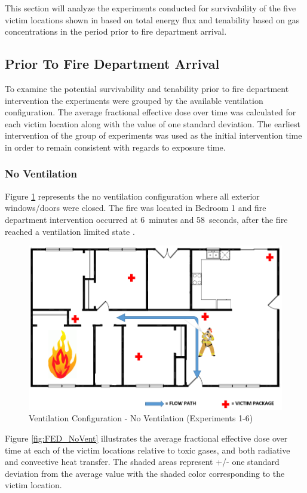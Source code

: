 \documentclass[12pt,oneside]{book}
\begin{document}
This section will analyze the experiments conducted for survivability of the five victim locations shown in  based on total energy flux and tenability based on gas concentrations in the period prior to fire department arrival. 

\subsection{Prior To Fire Department Arrival}
To examine the potential survivability and tenability prior to fire department intervention the experiments were grouped by the available ventilation configuration. The average fractional effective dose over time was calculated for each victim location along with the value of one standard deviation. The earliest intervention of the group of experiments was used as the initial intervention time in order to remain consistent with regards to exposure time.

\subsubsection{No Ventilation}

Figure \ref{fig:Vent_Profile-No_Vent} represents the no ventilation configuration where all exterior windows/doors were closed. The fire was located in Bedroom 1 and fire department intervention occurred at 6~minutes and 58~seconds, after the fire reached a ventilation limited state . 

\begin{figure}[H]
	\centering
	\includegraphics[width=.65\textwidth]{Figures/General/No_Vent_interior_config.png}
	\caption{Ventilation Configuration - No Ventilation (Experiments 1-6)}
	\label{fig:Vent_Profile-No_Vent}
\end{figure}

 Figure \ref{fig:FED_NoVent} illustrates the average fractional effective dose over time at each of the victim locations relative to toxic gases, and both radiative and convective heat transfer. The shaded areas represent +/- one standard deviation from the average value with the shaded color corresponding to the victim location. 
\end{document}
